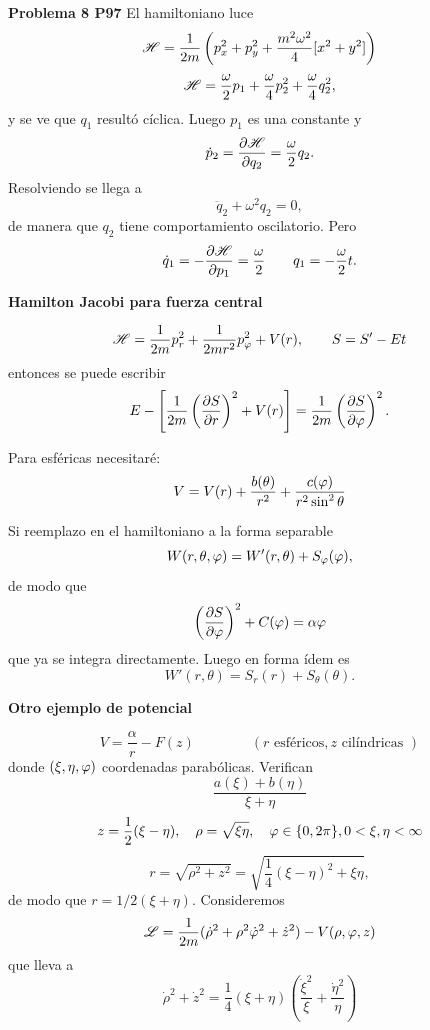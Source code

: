 \documentclass[10pt,oneside]{CBFT_book}
\begin{document}
\begin{ejemplo}{\bf Problema 8 P97}
El hamiltoniano luce
\[
	\mathscr{H} = \frac{1}{2m} \left( p_x^2 + p_y^2 + \frac{m^2\omega^2}{4}[ x^2 + y^2 ] \right)
\]
\[
	\mathscr{H} = \frac{\omega}{2} p_1 + \frac{\omega}{4} p_2^2 + \frac{\omega}{4} q_2^2,
\]
y se ve que $q_1$ resultó cíclica. Luego $p_1$ es una constante y 
\[
	\dot{p}_2 = \frac{\partial^{\hspace{-0.05em}} {\mathscr{H}}}{\partial {q_2}^{\hspace{-0.05em}}} = \frac{\omega}{2} q_2.
\]
Resolviendo se llega a 
\[
	\ddot{q}_2 + \omega^2 q_2 = 0,
\]
de manera que $q_2$ tiene comportamiento oscilatorio. Pero
\[
	\dot{q}_1 = -\frac{\partial^{\hspace{-0.05em}} {\mathscr{H}}}{\partial {p_1}^{\hspace{-0.05em}}} = \frac{\omega}{2} \qquad q_1 = - \frac{\omega}{2} t.
\]
\end{ejemplo}

\begin{ejemplo}{\bf Hamilton Jacobi para fuerza central}

\[
	\mathscr{H} = \frac{1}{2m} p_r^2 + \frac{1}{2mr^2}p_\varphi^2 + V(r), \qquad S = S' - Et
\]
entonces se puede escribir
\[
	E  - \left[ \frac{1}{2m}\left( \frac{\partial^{\hspace{-0.05em}} {S}}{\partial {r}^{\hspace{-0.05em}}} \right)^2 + V(r) \right] = \frac{1}{2m}\left( \frac{\partial^{\hspace{-0.05em}} {S}}{\partial {\varphi}^{\hspace{-0.05em}}} \right)^2.
\]

Para esféricas necesitaré:
\[
	V = V(r) + \frac{b(\theta)}{r^2} + \frac{c(\varphi)}{r^2 \sin^2\theta}
\]

Si reemplazo en el hamiltoniano a la forma separable
\[
	W(r, \theta, \varphi) = W'(r, \theta) + S_\varphi(\varphi),
\]
de modo que 
\[
	\left( \frac{\partial^{\hspace{-0.05em}} {S}}{\partial {\varphi}^{\hspace{-0.05em}}} \right)^2 + C(\varphi) = \alpha \varphi
\]
que ya se integra directamente. Luego en forma ídem es
\[
	W'(r, \theta) = S_r( r ) + S_\theta(\theta).
\]
\end{ejemplo}

\begin{ejemplo}{\bf Otro ejemplo de potencial}

\[
	V = \frac{\alpha}{r} - F(z) \qquad \qquad ( r \text{ esféricos}, z \text{ cilíndricas })
\]
donde $(\xi, \eta, \varphi)$ coordenadas parabólicas. Verifican
\[
	\frac{ a(\xi) + b(\eta) }{\xi + \eta}
\]
\[
	z = \frac 1 2 ( \xi - \eta ), \quad \rho =  \sqrt{\xi \eta}, \quad \varphi \in \{ 0, 2\pi \}, 0 < \xi, \eta < \infty 
\] 
\[
	r = \sqrt{ \rho^2 + z^2 } = \sqrt{ \frac{1}{4} ( \xi - \eta )^2 + \xi \eta },
\]
de modo que $r = 1/2 (\xi + \eta)$. Consideremos
\[
	\mathscr{L}  = \frac{1}{2m} ( \dot{\rho}^2 + \rho^2 \dot{\varphi}^2 + \dot{z}^2 ) - V(\rho,\varphi,z)
\]
que lleva a 
\[
	\dot{\rho}^2 + \dot{z}^2 = \frac{1}{4} ( \xi + \eta )\left( \frac{\dot{\xi}^2}{\xi} + \frac{\dot{\eta}^2}{\eta} \right)
\]
 
\end{ejemplo}







\end{document}
